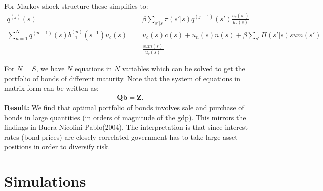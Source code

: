 \documentclass[12pt]{article}
\begin{document}
For Markov shock structure these simplifies to:
\begin{align*}
q^{(j)}(s) & = \beta \sum_{s'|s} \pi(s'|s) q^{(j-1)}(s') \frac{u_c(s')}{u_c(s)}\\
\sum_{n=1}^Nq^{(n-1)}(s)b_{-1}^{(n)}(s^{-1})u_c(s) & =  u_{c}(s) c(s) + u_{n}(s) n(s)  + \beta \sum_{s'} \Pi(s' | s) sum(s') \\
 & = \frac{sum(s)}{u_c(s)}
\end{align*}

For $N=S$, we have $N$ equations in $N$ variables which can be solved to get the portfolio of bonds of different maturity. Note that the system of equations in matrix form can be written as:
\begin{align*}
\mathbf{Q}\mathbf{b} = \mathbf{Z}.
\end{align*}
\textbf{Result:} We find that optimal portfolio of bonds involves sale and purchase of bonds in large quantities (in orders of magnitude of the gdp). This mirrors the findings in Buera-Nicolini-Pablo(2004). The interpretation is that since interest rates (bond prices) are closely correlated government has to take large asset positions in order to diversify risk.


\section{Simulations}
\end{document}
